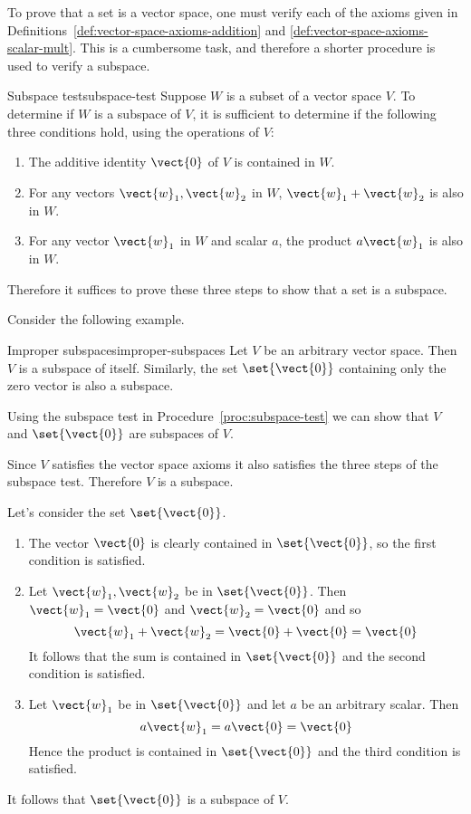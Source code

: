 To prove that a set is a vector space, one must verify each of the axioms given in Definitions~\ref{def:vector-space-axioms-addition} and {\ref{def:vector-space-axioms-scalar-mult}}. This is a cumbersome task, and therefore a shorter procedure is used to verify a subspace. 

\begin{procedure}{Subspace test}{subspace-test}
Suppose $W$ is a subset of a vector space $V$. To determine if $W$ is a subspace of $V$, it is sufficient to determine if the following three conditions hold, using the operations of $V$: 
\begin{enumerate}
\item
The additive identity $\vect{0}$ of $V$ is contained in $W$.
\item
For any vectors $\vect{w}_1, \vect{w}_2$ in $W$, $\vect{w}_1 + \vect{w}_2$ is also in $W$.
\item
For any vector $\vect{w}_1$ in $W$ and scalar $a$,  the product $a\vect{w}_1$ is also in $W$. 
\end{enumerate}
\end{procedure}

Therefore it suffices to prove these three steps to show that a set is a subspace. 

Consider the following example.

\begin{example}{Improper subspaces}{improper-subspaces}
Let $V$ be an arbitrary vector space. Then $V$ is a subspace of itself. Similarly, the set $\set{\vect{0} }$ containing only the zero vector is also a subspace. 
\end{example}

\begin{solution}
Using the subspace test in Procedure~\ref{proc:subspace-test} we can show that $V$ and $\set{\vect{0} }$ are subspaces of $V$. 

Since $V$ satisfies the vector space axioms it also satisfies the three steps of the subspace test. Therefore $V$ is a subspace.

Let's consider the set $\set{\vect{0} }$. 
\begin{enumerate}
\item
The vector $\vect{0}$ is clearly contained in  $\set{\vect{0} }$, so the first condition is satisfied.

\item
Let $\vect{w}_1, \vect{w}_2$ be in  $\set{\vect{0} }$. Then $\vect{w}_1 = \vect{0}$ and $\vect{w}_2 = \vect{0}$ and so 
\[
\vect{w}_1 + \vect{w}_2 = \vect{0} + \vect{0} = \vect{0}
\]
It follows that the sum is contained in $\set{\vect{0} }$ and the second condition is satisfied. 

\item
Let $\vect{w}_1$ be in  $\set{\vect{0} }$ and let $a$ be an arbitrary scalar. Then
\[
a\vect{w}_1  = a\vect{0} = \vect{0}
\]
Hence the product is contained in  $\set{\vect{0} }$ and the third condition is satisfied. 
\end{enumerate}

It follows that  $\set{\vect{0} }$ is a subspace of $V$. 
\end{solution}

